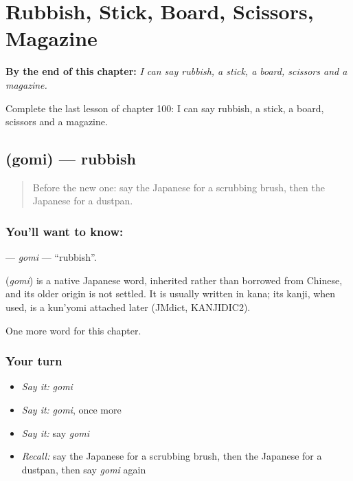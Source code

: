 
\chapter{Rubbish, Stick, Board, Scissors, Magazine}
\label{ch:ja-rubbish-stick-board-scissors-magazine}

\begin{chapteropening}
\textbf{By the end of this chapter:} \emph{I can say rubbish, a stick, a board, scissors and a magazine.}

Complete the last lesson of chapter 100: I can say rubbish, a stick, a board, scissors and a magazine.
\end{chapteropening}

\section[\texorpdfstring{\ja{ごみ} (gomi)}{ごみ (gomi)}]{ (gomi) — rubbish}

\label{lesson:JA-C100-gomi}



\begin{quote}
Before the new one: say the Japanese for a scrubbing brush, then the Japanese for a dustpan.
\end{quote}

\subsection*{You'll want to know: }
\textbf{} — \emph{gomi} — \textquotedblleft{}rubbish\textquotedblright{}.

\begin{cousinweb}
\textbf{} (\emph{gomi}) is a native Japanese word, inherited rather than borrowed from Chinese, and its older origin is not settled. It is usually written in kana; its kanji, when used, is a kun'yomi attached later (JMdict, KANJIDIC2).
\end{cousinweb}

\begin{grammarlens}[title={What you've built}]
One more word for this chapter.
\end{grammarlens}

\subsection*{Your turn}
\begin{itemize}
\raggedright
  \item \emph{Say it:} \emph{gomi}
  \item \emph{Say it:} \emph{gomi}, once more
  \item \emph{Say it:} say \emph{gomi}
  \item \emph{Recall:} say the Japanese for a scrubbing brush, then the Japanese for a dustpan, then say \emph{gomi} again
\end{itemize}

